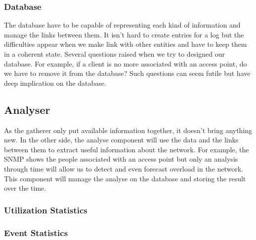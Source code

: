 \subsubsection{Database}
The database have to be capable of representing each kind of information and manage the links between them. It isn't hard to create entries for a log but the difficulties appear when we make link with other entities and have to keep them in a coherent state. Several questions raised when we try to designed our database. For example, if a client is no more associated with an access point, do we have to remove it from the database? Such questions can seem futile but have deep implication on the database.

\subsection{Analyser}
As the gatherer only put available information together, it doesn't bring anything new. In the other side, the analyse component will use the data and the links between them to extract useful information about the network. For example, the SNMP shows the people associated with an access point but only an analysis through time will allow us to detect and even forecast overload in the network. This component will manage the analyse on the database and storing the result over the time.

\subsubsection{Utilization Statistics}

\subsubsection{Event Statistics}

